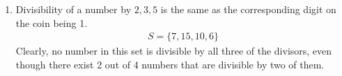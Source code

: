 \begin{enumerate}
    \item Divisibility of a number by $ 2,3,5 $ is the same as the corresponding digit
          on the coin being 1.
          \begin{align}
              S = \{7, 15, 10, 6\}
          \end{align}
          Clearly, no number in this set is divisible by all three of the divisors, even
          though there exist 2 out of 4 numbers that are divisible by two of them.
\end{enumerate}

